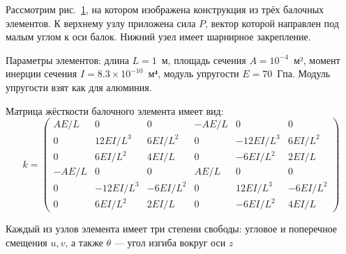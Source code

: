 \documentclass{article}
\newcommand{\figref}[1]{рис. \ref{#1}}
\newcommand{\node}[1]{$#1$}
\begin{document}
\begin{figure}[hb]
  \centering
  \label{fig:stand}
\end{figure}

Рассмотрим \figref{fig:stand}, на котором изображена конструкция из
трёх балочных элементов. К верхнему узлу приложена сила $P$, вектор
которой направлен под малым углом к оси балок. Нижний
узел имеет шарнирное закрепление.

Параметры элементов: длина $L = 1$ м, площадь сечения $A =
10^{-4}$ м², момент инерции сечения $I = 8.3 \times 10^{-10}$ м⁴,
модуль упругости $E = 70$ Гпа. Модуль упругости взят как для
алюминия.

Матрица жёсткости балочного элемента имеет вид:
\begin{equation*}
  k = \left(
    \begin{smallmatrix}
      AE/L& 0& 0& -AE/L& 0& 0\\
      0& 12EI/L^3& 6EI/L^2& 0& -12EI/L^3& 6EI/L^2\\
      0& 6EI/L^2& 4EI/L& 0& -6EI/L^2& 2EI/L\\
      -AE/L& 0& 0& AE/L& 0& 0\\
      0& -12EI/L^3& -6EI/L^2& 0& 12EI/L^3& -6EI/L^2\\
      0& 6EI/L^2& 2EI/L& 0& -6EI/L^2& 4EI/L
    \end{smallmatrix}\right)
\end{equation*}

Каждый из узлов элемента имеет три степени свободы: угловое и
поперечное смещения $u, v$, а также $\theta$ — угол изгиба вокруг оси
$z$
\end{document}
